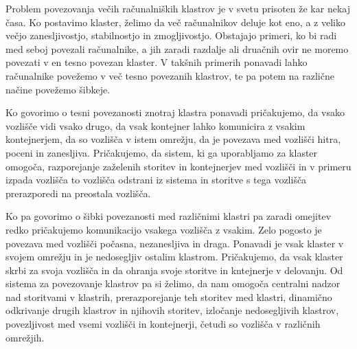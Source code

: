 \documentclass[a4paper, 12pt]{book}
\begin{document}
Problem povezovanja večih računalniških klastrov je v svetu prisoten že kar nekaj časa.
Ko postavimo klaster, želimo da več računalnikov deluje kot eno, a z veliko večjo zanesljivostjo, stabilnostjo in zmogljivostjo.
Obstajajo primeri, ko bi radi med seboj povezali računalnike, a jih zaradi razdalje ali druačnih ovir ne moremo povezati v en tesno povezan klaster.
V takšnih primerih ponavadi lahko računalnike povežemo v več tesno povezanih klastrov, te pa potem na različne načine povežemo šibkeje.

Ko govorimo o tesni povezanosti znotraj klastra ponavadi pričakujemo, da vsako vozlišče vidi vsako drugo, da vsak kontejner lahko komunicira z vsakim kontejnerjem, da so vozlišča v istem omrežju, da je povezava med vozlišči hitra, poceni in zanesljiva. 
Pričakujemo, da sistem, ki ga uporabljamo za klaster omogoča, razporejanje zaželenih storitev in kontejnerjev med vozlišči in v primeru izpada vozlišča to vozlišča odstrani iz sistema in storitve s tega vozlišča prerazporedi na preostala vozlišča.

Ko pa govorimo o šibki povezanosti med različnimi klastri pa zaradi omejitev redko pričakujemo komunikacijo vsakega vozlišča z vsakim.
Zelo pogosto je povezava med vozlišči počasna, nezanesljiva in draga.
Ponavadi je vsak klaster v svojem omrežju in je nedosegljiv ostalim klastrom.
Pričakujemo, da vsak klaster skrbi za svoja vozlišča in da ohranja svoje storitve in kntejnerje v delovanju.
Od sistema za povezovanje klastrov pa si želimo, da nam omogoča centralni nadzor nad storitvami v klastrih, prerazporejanje teh storitev med klastri, dinamično odkrivanje drugih klastrov in njihovih storitev, izločanje nedosegljivih klastrov, povezljivost med vsemi vozlišči in kontejnerji, četudi so vozlišča v različnih omrežjih.
\end{document}
